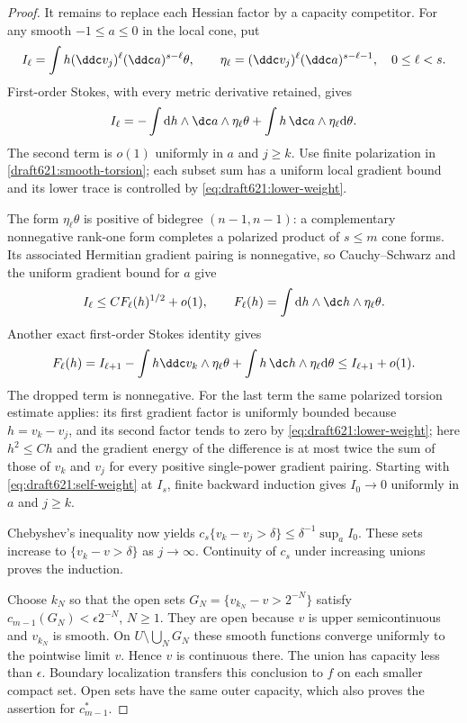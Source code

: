 \begin{proof}
It remains to replace each Hessian factor by a capacity competitor.
For any smooth $-1\leq a\leq0$ in the local cone, put
\[
 I_\ell=\int h(\ddc v_j)^\ell(\ddc a)^{s-\ell}\theta,
 \qquad
 \eta_\ell=(\ddc v_j)^\ell(\ddc a)^{s-\ell-1},
                \quad0\leq\ell<s.
\]
First-order Stokes, with every metric derivative retained, gives
\[
 I_\ell=-\int\mathrm dh\wedge\dc a\wedge\eta_\ell\theta
          +\int h\,\dc a\wedge\eta_\ell\mathrm d\theta.
\]
The second term is $o(1)$ uniformly in $a$ and $j\geq k$.
Use finite polarization in \cref{draft621:smooth-torsion}; each
subset sum has a uniform local gradient bound and its lower trace
is controlled by \eqref{eq:draft621:lower-weight}.

The form $\eta_\ell\theta$ is positive of bidegree $(n-1,n-1)$:
a complementary nonnegative rank-one form completes a polarized
product of $s\leq m$ cone forms. Its associated Hermitian
gradient pairing is nonnegative, so Cauchy--Schwarz and the uniform
gradient bound for $a$ give
\[
 I_\ell\leq C F_\ell(h)^{1/2}+o(1),
 \qquad F_\ell(h)=\int\mathrm dh\wedge\dc h\wedge\eta_\ell\theta.
\]
Another exact first-order Stokes identity gives
\[
 F_\ell(h)= I_{\ell+1}
       -\int h\ddc v_k\wedge\eta_\ell\theta
       +\int h\,\dc h\wedge\eta_\ell\mathrm d\theta
                    \leq I_{\ell+1}+o(1).
\]
The dropped term is nonnegative. For the last term the same
polarized torsion estimate applies: its first gradient factor is
uniformly bounded because $h=v_k-v_j$, and its second factor
tends to zero by \eqref{eq:draft621:lower-weight}; here
$h^2\leq C h$ and the gradient energy of the difference is at
most twice the sum of those of $v_k$ and $v_j$ for every positive
single-power gradient pairing.
Starting with \eqref{eq:draft621:self-weight} at $I_s$, finite
backward induction gives $I_0\to0$ uniformly in $a$ and $j\geq k$.

Chebyshev's inequality now yields
$c_s\{v_k-v_j>\delta\}\leq\delta^{-1}\sup_a I_0$.
These sets increase to $\{v_k-v>\delta\}$ as $j\to\infty$.
Continuity of $c_s$ under increasing unions proves the induction.

Choose $k_N$ so that the open sets
$G_N=\{v_{k_N}-v>2^{-N}\}$ satisfy
$c_{m-1}(G_N)<\epsilon2^{-N}$, $N\geq1$.
They are open because $v$ is upper semicontinuous and $v_{k_N}$
is smooth. On $U\setminus\bigcup_NG_N$ these smooth functions
converge uniformly to the pointwise limit $v$. Hence $v$ is
continuous there. The union has capacity less than $\epsilon$.
Boundary localization transfers this conclusion to $f$ on each
smaller compact set. Open sets have the same outer capacity, which
also proves the assertion for $c_{m-1}^*$.
\end{proof}


